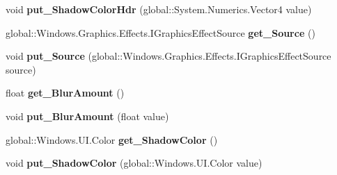 \begin{DoxyCompactItemize}
void {\bfseries put\+\_\+\+Shadow\+Color\+Hdr} (global\+::\+System.\+Numerics.\+Vector4 value)
\item 
\mbox{\label{interface_microsoft_1_1_graphics_1_1_canvas_1_1_effects_1_1_i_shadow_effect_a344919ac690c7502e2a1c28ee4f5966f}} 
global\+::\+Windows.\+Graphics.\+Effects.\+I\+Graphics\+Effect\+Source {\bfseries get\+\_\+\+Source} ()
\item 
\mbox{\label{interface_microsoft_1_1_graphics_1_1_canvas_1_1_effects_1_1_i_shadow_effect_acea577b60a4e50cef4fea7cdea1764f9}} 
void {\bfseries put\+\_\+\+Source} (global\+::\+Windows.\+Graphics.\+Effects.\+I\+Graphics\+Effect\+Source source)
\item 
\mbox{\label{interface_microsoft_1_1_graphics_1_1_canvas_1_1_effects_1_1_i_shadow_effect_a49b43e4fdcdcf0af12d8a5e4005a11e8}} 
float {\bfseries get\+\_\+\+Blur\+Amount} ()
\item 
\mbox{\label{interface_microsoft_1_1_graphics_1_1_canvas_1_1_effects_1_1_i_shadow_effect_a9d0a51d4856757395eab29060b840a88}} 
void {\bfseries put\+\_\+\+Blur\+Amount} (float value)
\item 
\mbox{\label{interface_microsoft_1_1_graphics_1_1_canvas_1_1_effects_1_1_i_shadow_effect_adcb13593e07a265b7d02f8cc8a31445a}} 
global\+::\+Windows.\+U\+I.\+Color {\bfseries get\+\_\+\+Shadow\+Color} ()
\item 
\mbox{\label{interface_microsoft_1_1_graphics_1_1_canvas_1_1_effects_1_1_i_shadow_effect_aa05abfa69f066a62740ff1025d57fd9c}} 
void {\bfseries put\+\_\+\+Shadow\+Color} (global\+::\+Windows.\+U\+I.\+Color value)
\item 
\mbox{\label{interface_microsoft_1_1_graphics_1_1_canvas_1_1_effects_1_1_i_shadow_effect_a3d8042cc4e97fb3285cfbbb0f3c8a52f}} 

\end{DoxyCompactItemize}
